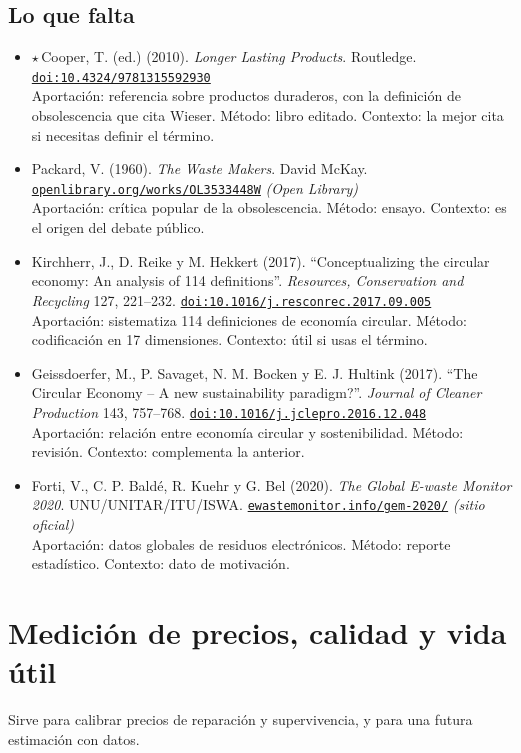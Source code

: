 \documentclass[11pt]{article}
\begin{document}
\subsection*{Lo que falta}
\begin{itemize}
\item $\star$\,Cooper, T. (ed.) (2010). \textit{Longer Lasting Products}. Routledge. \href{https://doi.org/10.4324/9781315592930}{\texttt{doi:10.4324/9781315592930}}\\
Aportación: referencia sobre productos duraderos, con la definición de obsolescencia que cita Wieser. Método: libro editado. Contexto: la mejor cita si necesitas definir el término.
\item Packard, V. (1960). \textit{The Waste Makers}. David McKay. \href{https://openlibrary.org/works/OL3533448W}{\texttt{openlibrary.org/works/OL3533448W}} \textit{(Open Library)}\\
Aportación: crítica popular de la obsolescencia. Método: ensayo. Contexto: es el origen del debate público.
\item Kirchherr, J., D. Reike y M. Hekkert (2017). ``Conceptualizing the circular economy: An analysis of 114 definitions''. \textit{Resources, Conservation and Recycling} 127, 221--232. \href{https://doi.org/10.1016/j.resconrec.2017.09.005}{\texttt{doi:10.1016/j.resconrec.2017.09.005}}\\
Aportación: sistematiza 114 definiciones de economía circular. Método: codificación en 17 dimensiones. Contexto: útil si usas el término.
\item Geissdoerfer, M., P. Savaget, N. M. Bocken y E. J. Hultink (2017). ``The Circular Economy – A new sustainability paradigm?''. \textit{Journal of Cleaner Production} 143, 757--768. \href{https://doi.org/10.1016/j.jclepro.2016.12.048}{\texttt{doi:10.1016/j.jclepro.2016.12.048}}\\
Aportación: relación entre economía circular y sostenibilidad. Método: revisión. Contexto: complementa la anterior.
\item Forti, V., C. P. Baldé, R. Kuehr y G. Bel (2020). \textit{The Global E-waste Monitor 2020}. UNU/UNITAR/ITU/ISWA. \href{https://ewastemonitor.info/gem-2020/}{\texttt{ewastemonitor.info/gem-2020/}} \textit{(sitio oficial)}\\
Aportación: datos globales de residuos electrónicos. Método: reporte estadístico. Contexto: dato de motivación.
\end{itemize}

\section{Medición de precios, calidad y vida útil}
Sirve para calibrar precios de reparación y supervivencia, y para una futura estimación con datos.
\end{document}
